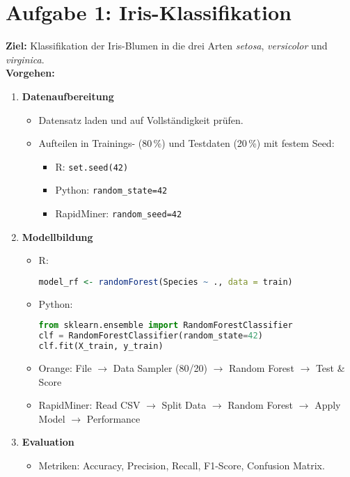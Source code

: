 \documentclass[a4paper,12pt]{article}
\begin{document}
\section*{Aufgabe 1: Iris-Klassifikation}

\textbf{Ziel:} Klassifikation der Iris-Blumen in die drei Arten \textit{setosa}, \textit{versicolor} und \textit{virginica}.\\

\textbf{Vorgehen:}
\begin{enumerate}
  \item \textbf{Datenaufbereitung}
    \begin{itemize}
      \item Datensatz laden und auf Vollständigkeit prüfen.
      \item Aufteilen in Trainings- (80\,\%) und Testdaten (20\,\%) mit festem Seed:
      \begin{itemize}
        \item R: \lstinline|set.seed(42)|
        \item Python: \lstinline|random_state=42|
        \item RapidMiner: \lstinline|random_seed=42|
      \end{itemize}
    \end{itemize}
  \item \textbf{Modellbildung}
    \begin{itemize}
      \item R:
      \begin{lstlisting}[language=R]
model_rf <- randomForest(Species ~ ., data = train)
      \end{lstlisting}
      \item Python:
      \begin{lstlisting}[language=Python]
from sklearn.ensemble import RandomForestClassifier
clf = RandomForestClassifier(random_state=42)
clf.fit(X_train, y_train)
      \end{lstlisting}
      \item Orange: File $\to$ Data Sampler (80/20) $\to$ Random Forest $\to$ Test & Score
      \item RapidMiner: Read CSV $\to$ Split Data $\to$ Random Forest $\to$ Apply Model $\to$ Performance
    \end{itemize}
  \item \textbf{Evaluation}
    \begin{itemize}
      \item Metriken: Accuracy, Precision, Recall, F1-Score, Confusion Matrix.
    \end{itemize}
\end{enumerate}
\end{document}
